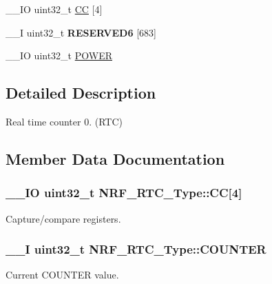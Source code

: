 \begin{DoxyCompactItemize}
\item 
\+\_\+\+\_\+\+I\+O uint32\+\_\+t \hyperlink{struct_n_r_f___r_t_c___type_af9538d88324a98c038e6869358d92f6b}{C\+C} \mbox{[}4\mbox{]}
\item 
\hypertarget{struct_n_r_f___r_t_c___type_ad21be5f1a134032cda5151590a24a953}{}\+\_\+\+\_\+\+I uint32\+\_\+t {\bfseries R\+E\+S\+E\+R\+V\+E\+D6} \mbox{[}683\mbox{]}\label{struct_n_r_f___r_t_c___type_ad21be5f1a134032cda5151590a24a953}

\item 
\+\_\+\+\_\+\+I\+O uint32\+\_\+t \hyperlink{struct_n_r_f___r_t_c___type_a6985ce32d3567442748393b332853ed3}{P\+O\+W\+E\+R}
\end{DoxyCompactItemize}


\subsection{Detailed Description}
Real time counter 0. (R\+T\+C) 

\subsection{Member Data Documentation}
\hypertarget{struct_n_r_f___r_t_c___type_af9538d88324a98c038e6869358d92f6b}{}
\subsubsection[{C\+C}]{\setlength{\rightskip}{0pt plus 5cm}\+\_\+\+\_\+\+I\+O uint32\+\_\+t N\+R\+F\+\_\+\+R\+T\+C\+\_\+\+Type\+::\+C\+C\mbox{[}4\mbox{]}}\label{struct_n_r_f___r_t_c___type_af9538d88324a98c038e6869358d92f6b}
Capture/compare registers. \hypertarget{struct_n_r_f___r_t_c___type_a21385db62b0f5fb972474617ca8e51e0}{}
\subsubsection[{C\+O\+U\+N\+T\+E\+R}]{\setlength{\rightskip}{0pt plus 5cm}\+\_\+\+\_\+\+I uint32\+\_\+t N\+R\+F\+\_\+\+R\+T\+C\+\_\+\+Type\+::\+C\+O\+U\+N\+T\+E\+R}\label{struct_n_r_f___r_t_c___type_a21385db62b0f5fb972474617ca8e51e0}
Current C\+O\+U\+N\+T\+E\+R value. \hypertarget{struct_n_r_f___r_t_c___type_a282a8685698382ed088f5d9bb81d2319}{}
